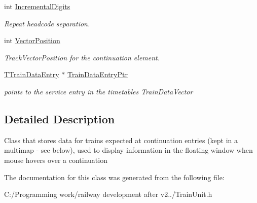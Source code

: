 \begin{DoxyCompactItemize}
\mbox{\label{class_t_train_controller_1_1_t_continuation_train_expectation_entry_af6516a6832fe532a42fd3757fa4143a0}} 
int \mbox{\hyperlink{class_t_train_controller_1_1_t_continuation_train_expectation_entry_af6516a6832fe532a42fd3757fa4143a0}{Incremental\+Digits}}
\begin{DoxyCompactList}\small\item\em Repeat headcode separation. \end{DoxyCompactList}\item 
\mbox{\label{class_t_train_controller_1_1_t_continuation_train_expectation_entry_a77f5a64b552a6d938b1ab2a0e3488c11}} 
int \mbox{\hyperlink{class_t_train_controller_1_1_t_continuation_train_expectation_entry_a77f5a64b552a6d938b1ab2a0e3488c11}{Vector\+Position}}
\begin{DoxyCompactList}\small\item\em Track\+Vector\+Position for the continuation element. \end{DoxyCompactList}\item 
\mbox{\label{class_t_train_controller_1_1_t_continuation_train_expectation_entry_ad710cc4b0bde6c917aaba9c732773bcb}} 
\mbox{\hyperlink{class_t_train_data_entry}{T\+Train\+Data\+Entry}} $\ast$ \mbox{\hyperlink{class_t_train_controller_1_1_t_continuation_train_expectation_entry_ad710cc4b0bde6c917aaba9c732773bcb}{Train\+Data\+Entry\+Ptr}}
\begin{DoxyCompactList}\small\item\em points to the service entry in the timetable\textquotesingle{}s Train\+Data\+Vector \end{DoxyCompactList}\end{DoxyCompactItemize}


\subsection{Detailed Description}
Class that stores data for trains expected at continuation entries (kept in a multimap -\/ see below), used to display information in the floating window when mouse hovers over a continuation 

The documentation for this class was generated from the following file\+:\begin{DoxyCompactItemize}
\item 
C\+:/\+Programming work/railway development after v2../Train\+Unit.\+h\end{DoxyCompactItemize}
